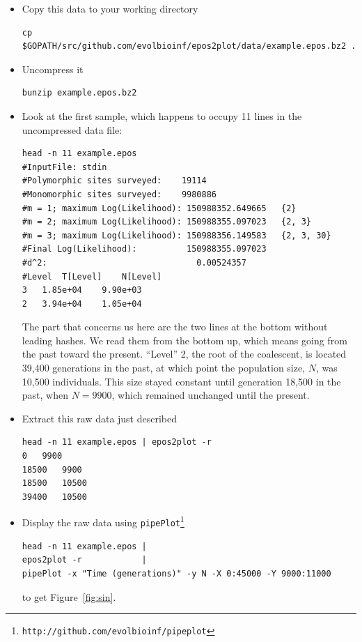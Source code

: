 \documentclass[a4paper]{article}
\newcommand{\ty}{\texttt}
\begin{document}
\begin{itemize}
\item Copy this data to your working directory
\begin{verbatim}
cp $GOPATH/src/github.com/evolbioinf/epos2plot/data/example.epos.bz2 .
\end{verbatim}
\item Uncompress it
\begin{verbatim}
bunzip example.epos.bz2
\end{verbatim}
\item Look at the first sample, which happens to occupy 11 lines in
  the uncompressed data file:
\begin{verbatim}
head -n 11 example.epos 
#InputFile:	stdin
#Polymorphic sites surveyed:	19114
#Monomorphic sites surveyed:	9980886
#m = 1; maximum Log(Likelihood): 150988352.649665	{2}
#m = 2; maximum Log(Likelihood): 150988355.097023	{2, 3}
#m = 3; maximum Log(Likelihood): 150988356.149583	{2, 3, 30}
#Final Log(Likelihood):          150988355.097023
#d^2:                              0.00524357
#Level	T[Level]	N[Level]
3	1.85e+04	9.90e+03
2	3.94e+04	1.05e+04
\end{verbatim}
The part that concerns us here are the two lines at the bottom without
leading hashes. We read them from the bottom up, which means going
from the past toward the present. ``Level'' 2, the root of the
coalescent, is located 39,400 generations in the past, at
which point the population size, $N$, was 10,500 individuals. This
size stayed constant until generation 18,500 in the past,
when $N=9900$, which remained unchanged until the present.

\item Extract this raw data just described
\begin{verbatim}
head -n 11 example.epos | epos2plot -r
0	9900
18500	9900
18500	10500
39400	10500
\end{verbatim}
\item Display the raw data  using \ty{pipePlot}\footnote{\ty{http://github.com/evolbioinf/pipeplot}}
\begin{verbatim}
head -n 11 example.epos | 
epos2plot -r            | 
pipePlot -x "Time (generations)" -y N -X 0:45000 -Y 9000:11000
\end{verbatim}
to get Figure~\ref{fig:sin}.


\end{itemize}
\end{document}
